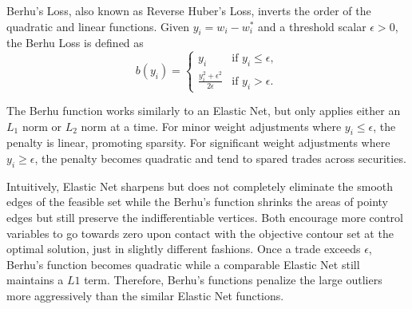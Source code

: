 \documentclass[11pt, letterpaper]{article}
\begin{document}
Berhu's Loss, also known as Reverse Huber's Loss, inverts the order of the quadratic and linear functions. Given
$y_i = w_i - w_i^*$ and a threshold scalar $\epsilon > 0$, the Berhu Loss is defined as
\begin{equation}
\label{berhu_loss}
    b(y_i) = \begin{cases}
        y_i & \text{if } y_i \leq \epsilon, \\
        \frac{y_i^2 + \epsilon^2}{2\epsilon} & \text{if } y_i > \epsilon.
    \end{cases}
\end{equation}

The Berhu function works similarly to an Elastic Net, but only applies either an $L_1$ norm or $L_2$ norm at a time. For minor
weight adjustments where $y_i \leq \epsilon$, the penalty is linear, promoting sparsity. For significant weight adjustments
where $y_i \geq \epsilon$, the penalty becomes quadratic and tend to spared trades across securities.

Intuitively, Elastic Net sharpens but does not completely eliminate the smooth edges of the feasible set while the Berhu's
function shrinks the areas of pointy edges but still preserve the indifferentiable vertices. Both encourage more control
variables to go towards zero upon contact with the objective contour set at the optimal solution, just in slightly different
fashions. Once a trade exceeds $\epsilon$, Berhu's function becomes quadratic while a comparable Elastic Net still maintains a
$L1$ term. Therefore, Berhu's functions penalize the large outliers more aggressively than the similar Elastic Net functions.
\end{document}
